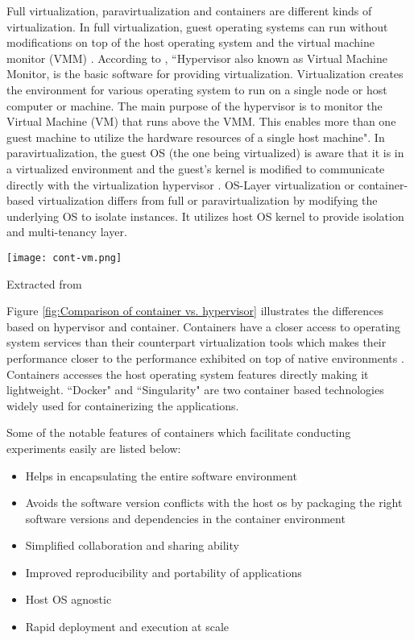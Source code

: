Full virtualization, paravirtualization and containers are different kinds of virtualization. In full virtualization, guest operating systems can run without modifications on top of the host operating system and the virtual machine monitor (VMM) \cite{7382987}. According to \cite{hypervisor}, ``Hypervisor also known as Virtual Machine Monitor, is the basic software for providing virtualization. Virtualization creates the environment for various operating system to run on a single node or host computer or machine. The main purpose of the hypervisor is to monitor the Virtual Machine (VM) that runs above the VMM. This enables more than one guest machine to utilize the hardware resources of a single host machine". In paravirtualization, the guest OS (the one being virtualized) is aware that it is in a virtualized environment and the guest's kernel is modified to communicate directly with the virtualization hypervisor \cite{7382987}. OS-Layer virtualization or container-based virtualization differs from full or paravirtualization by modifying the underlying OS to isolate instances. It utilizes host OS kernel to provide isolation and multi-tenancy layer.

\begin{center}
\texttt{[image: cont-vm.png]}
\label{fig:Comparison of container vs. hypervisor}
\caption*{Extracted from \cite{7382987}}
\end{center}

Figure \ref{fig:Comparison of container vs. hypervisor} illustrates the differences based on hypervisor and container. Containers have a closer access to operating system services than their counterpart virtualization tools which makes their performance closer to the performance exhibited on top of native environments \cite{Xavier:2013:PEC:2497369.2497577}. Containers accesses the host operating system features directly making it lightweight. ``Docker" and ``Singularity" are two container based technologies widely used for containerizing the applications.

Some of the notable features of containers \cite{docker-run} \cite{DBLP:journals/corr/HaleLRW16} \cite{Julian:2016:CRI:2949550.2949562} \cite{10.1109/ISPASS.2015.7095802} which facilitate conducting experiments easily are listed below:

\begin{itemize}
  \item Helps in encapsulating the entire software environment
  \item Avoids the software version conflicts with the host os by packaging the right software versions and dependencies in the container environment
  \item Simplified collaboration and sharing ability
  \item Improved reproducibility and portability of applications
  \item Host OS agnostic
  \item Rapid deployment and execution at scale
\end{itemize}


